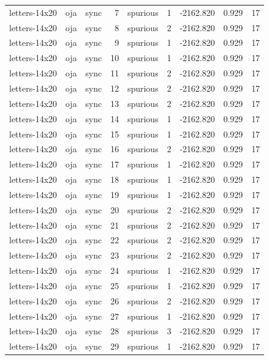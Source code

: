 \begin{tabular}{lllrlrrrr}
letters-14x20 & oja & sync & 7 & spurious & 1 & -2162.820 & 0.929 & 17 \\
letters-14x20 & oja & sync & 8 & spurious & 2 & -2162.820 & 0.929 & 17 \\
letters-14x20 & oja & sync & 9 & spurious & 1 & -2162.820 & 0.929 & 17 \\
letters-14x20 & oja & sync & 10 & spurious & 1 & -2162.820 & 0.929 & 17 \\
letters-14x20 & oja & sync & 11 & spurious & 2 & -2162.820 & 0.929 & 17 \\
letters-14x20 & oja & sync & 12 & spurious & 2 & -2162.820 & 0.929 & 17 \\
letters-14x20 & oja & sync & 13 & spurious & 2 & -2162.820 & 0.929 & 17 \\
letters-14x20 & oja & sync & 14 & spurious & 1 & -2162.820 & 0.929 & 17 \\
letters-14x20 & oja & sync & 15 & spurious & 1 & -2162.820 & 0.929 & 17 \\
letters-14x20 & oja & sync & 16 & spurious & 2 & -2162.820 & 0.929 & 17 \\
letters-14x20 & oja & sync & 17 & spurious & 1 & -2162.820 & 0.929 & 17 \\
letters-14x20 & oja & sync & 18 & spurious & 1 & -2162.820 & 0.929 & 17 \\
letters-14x20 & oja & sync & 19 & spurious & 1 & -2162.820 & 0.929 & 17 \\
letters-14x20 & oja & sync & 20 & spurious & 2 & -2162.820 & 0.929 & 17 \\
letters-14x20 & oja & sync & 21 & spurious & 2 & -2162.820 & 0.929 & 17 \\
letters-14x20 & oja & sync & 22 & spurious & 2 & -2162.820 & 0.929 & 17 \\
letters-14x20 & oja & sync & 23 & spurious & 2 & -2162.820 & 0.929 & 17 \\
letters-14x20 & oja & sync & 24 & spurious & 1 & -2162.820 & 0.929 & 17 \\
letters-14x20 & oja & sync & 25 & spurious & 1 & -2162.820 & 0.929 & 17 \\
letters-14x20 & oja & sync & 26 & spurious & 2 & -2162.820 & 0.929 & 17 \\
letters-14x20 & oja & sync & 27 & spurious & 1 & -2162.820 & 0.929 & 17 \\
letters-14x20 & oja & sync & 28 & spurious & 3 & -2162.820 & 0.929 & 17 \\
letters-14x20 & oja & sync & 29 & spurious & 1 & -2162.820 & 0.929 & 17 \\

\end{tabular}
